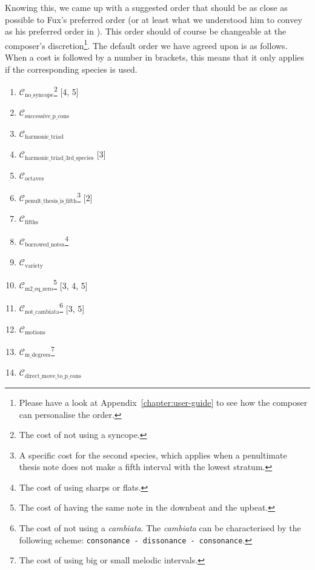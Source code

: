 Knowing this, we came up with a suggested order that should be as close as possible to Fux's preferred order (or at least what we understood him to convey as his preferred order in \gap). This order should of course be changeable at the composer's discretion\footnote{Please have a look at Appendix~\ref{chapter:user-guide} to see how the composer can personalise the order.}. The default order we have agreed upon is as follows. When a cost is followed by a number in brackets, this means that it only applies if the corresponding species is used.
\begin{multicols}{2}
    \begin{enumerate}\label{fig:default-order-lexico}
        \item $\mathcal{C}_\text{no\_syncope}$\footnote{The cost of not using a syncope.} [4, 5] 
        \item $\mathcal{C}_\text{successive\_p\_cons}$
        \item $\mathcal{C}_\text{harmonic\_triad}$
        \item $\mathcal{C}_\text{harmonic\_triad\_3rd\_species}$ [3]
        \item $\mathcal{C}_\text{octaves}$
        \item $\mathcal{C}_\text{penult\_thesis\_is\_fifth}$\footnote{A specific cost for the second species, which applies when a penultimate thesis note does not make a fifth interval with the lowest stratum.} [2]
        \item $\mathcal{C}_\text{fifths}$
        \item $\mathcal{C}_\text{borrowed\_notes}$\footnote{The cost of using sharps or flats.}
        \item $\mathcal{C}_\text{variety}$
        \item $\mathcal{C}_\text{m2\_eq\_zero}$\footnote{The cost of having the same note in the downbeat and the upbeat.} [3, 4, 5]
        \item $\mathcal{C}_\text{not\_cambiata}$\footnote{The cost of not using a \textit{cambiata}. The \textit{cambiata} can be characterised by the following scheme: \texttt{consonance - dissonance - consonance}.} [3, 5]
        \item $\mathcal{C}_\text{motions}$
        \item $\mathcal{C}_\text{m\_degrees}$\footnote{The cost of using big or small melodic intervals.}        
        \item $\mathcal{C}_\text{direct\_move\_to\_p\_cons}$
    \end{enumerate}
\end{multicols}

